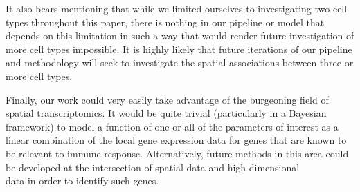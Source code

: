 \documentclass[
]{book}
\begin{document}
It also bears mentioning that while we limited ourselves to
investigating two cell types throughout this paper, there is nothing in
our pipeline or model that depends on this limitation in such a way that
would render future investigation of more cell types impossible. It is
highly likely that future iterations of our pipeline and methodology
will seek to investigate the spatial associations between three or more
cell types.

Finally, our work could very easily take advantage of the burgeoning
field of spatial transcriptomics. It would be quite trivial
(particularly in a Bayesian framework) to model a function of one or all
of the parameters of interest as a linear combination of the local gene
expression data for genes that are known to be relevant to immune
response. Alternatively, future methods in this area could be developed
at the intersection of spatial data and high dimensional\\
data in order to identify such genes.

  
\end{document}
